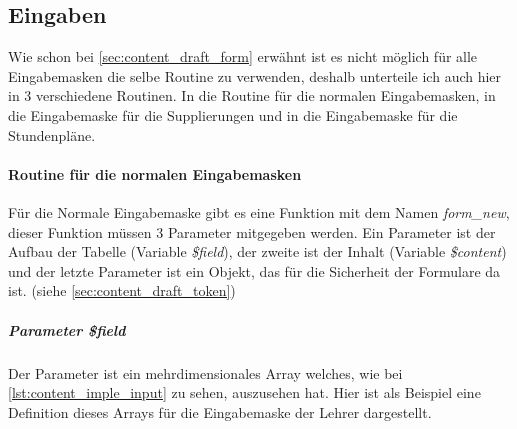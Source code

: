 \subsection{Eingaben}
%
%
%
% 
%
Wie schon bei \autoref{sec:content_draft_form} erwähnt ist es nicht möglich für alle Eingabemasken die selbe Routine zu verwenden, deshalb unterteile ich auch hier in 3 verschiedene Routinen. In die Routine für die normalen Eingabemasken, in die Eingabemaske für die Supplierungen und in die Eingabemaske für die Stundenpläne.
\paragraph{Routine für die normalen Eingabemasken}
Für die Normale Eingabemaske gibt es eine Funktion mit dem Namen \textit{form\_new}, dieser Funktion müssen 3 Parameter mitgegeben werden. Ein Parameter ist der Aufbau der Tabelle (Variable \textit{\$field}), der zweite ist der Inhalt (Variable \textit{\$content}) und der letzte Parameter ist ein Objekt, das für die Sicherheit der Formulare da ist. (siehe \autoref{sec:content_draft_token})\\
\subparagraph{Parameter \textit{\$field}}
Der Parameter ist ein mehrdimensionales Array welches, wie bei \autoref{lst:content_imple_input} zu sehen, auszusehen hat. Hier ist als Beispiel eine Definition dieses Arrays für die Eingabemaske der Lehrer dargestellt.
